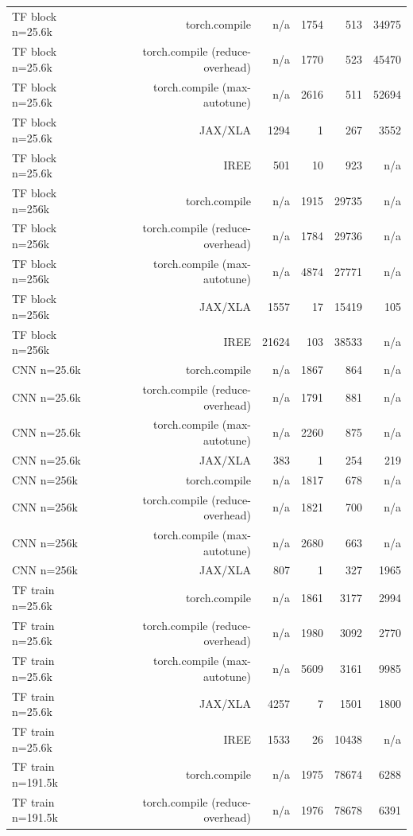 \begin{tabular}{lrrrrr}
TF block n=25.6k & torch.compile & n/a & 1754 & 513 & 34975 \\
TF block n=25.6k & torch.compile (reduce-overhead) & n/a & 1770 & 523 & 45470 \\
TF block n=25.6k & torch.compile (max-autotune) & n/a & 2616 & 511 & 52694 \\
TF block n=25.6k & JAX/XLA & 1294 & 1 & 267 & 3552 \\
TF block n=25.6k & IREE & 501 & 10 & 923 & n/a \\
TF block n=256k & torch.compile & n/a & 1915 & 29735 & n/a \\
TF block n=256k & torch.compile (reduce-overhead) & n/a & 1784 & 29736 & n/a \\
TF block n=256k & torch.compile (max-autotune) & n/a & 4874 & 27771 & n/a \\
TF block n=256k & JAX/XLA & 1557 & 17 & 15419 & 105 \\
TF block n=256k & IREE & 21624 & 103 & 38533 & n/a \\
CNN n=25.6k & torch.compile & n/a & 1867 & 864 & n/a \\
CNN n=25.6k & torch.compile (reduce-overhead) & n/a & 1791 & 881 & n/a \\
CNN n=25.6k & torch.compile (max-autotune) & n/a & 2260 & 875 & n/a \\
CNN n=25.6k & JAX/XLA & 383 & 1 & 254 & 219 \\
CNN n=256k & torch.compile & n/a & 1817 & 678 & n/a \\
CNN n=256k & torch.compile (reduce-overhead) & n/a & 1821 & 700 & n/a \\
CNN n=256k & torch.compile (max-autotune) & n/a & 2680 & 663 & n/a \\
CNN n=256k & JAX/XLA & 807 & 1 & 327 & 1965 \\
TF train n=25.6k & torch.compile & n/a & 1861 & 3177 & 2994 \\
TF train n=25.6k & torch.compile (reduce-overhead) & n/a & 1980 & 3092 & 2770 \\
TF train n=25.6k & torch.compile (max-autotune) & n/a & 5609 & 3161 & 9985 \\
TF train n=25.6k & JAX/XLA & 4257 & 7 & 1501 & 1800 \\
TF train n=25.6k & IREE & 1533 & 26 & 10438 & n/a \\
TF train n=191.5k & torch.compile & n/a & 1975 & 78674 & 6288 \\
TF train n=191.5k & torch.compile (reduce-overhead) & n/a & 1976 & 78678 & 6391 \\

\end{tabular}
